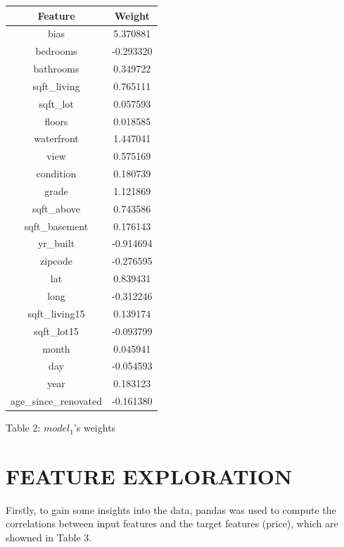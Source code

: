 \documentclass[12pt,article]{article}
\begin{document}
\begin{center}
    \begin{tabular}{ |c|c|} 
        \hline
        Feature & Weight \\
        \hline
        bias                &  5.370881 \\
        bedrooms            & -0.293320 \\
        bathrooms           &  0.349722 \\
        sqft\_living         &  0.765111 \\
        sqft\_lot            &  0.057593 \\
        floors              &  0.018585 \\
        waterfront          &  1.447041 \\
        view                &  0.575169 \\
        condition           &  0.180739 \\
        grade               &  1.121869 \\
        sqft\_above          &  0.743586 \\
        sqft\_basement       &  0.176143 \\
        yr\_built            & -0.914694 \\
        zipcode             & -0.276595 \\
        lat                 &  0.839431 \\
        long                & -0.312246 \\
        sqft\_living15       &  0.139174 \\
        sqft\_lot15          & -0.093799 \\
        month               &  0.045941 \\
        day                 & -0.054593 \\
        year                &  0.183123 \\
        age\_since\_renovated & -0.161380 \\
        \hline
    \end{tabular}
    
    Table 2: \textbf{$model_1$}'s weights
\end{center}

\newpage
\section*{FEATURE EXPLORATION}
Firstly, to gain some insights into the data, pandas was used to compute the 
correlations between input features and the target features (price), which are 
showned in Table 3.
\end{document}
